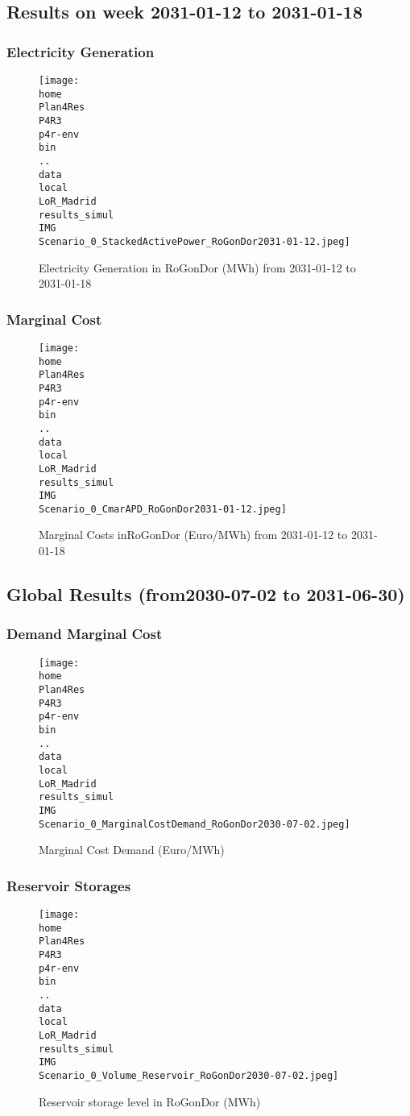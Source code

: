 \documentclass[10pt]{report}
\begin{document}
\subsection{Results on week 2031-01-12 to 2031-01-18}
\subsubsection{Electricity Generation}
\begin{figure}[H]
\centering
\texttt{[image: \\home\\Plan4Res\\P4R3\\p4r-env\\bin\\..\\data\\local\\LoR\_Madrid\\results\_simul\\IMG\\Scenario\_0\_StackedActivePower\_RoGonDor2031-01-12.jpeg]}
\caption{Electricity Generation in RoGonDor (MWh) from 2031-01-12 to 2031-01-18}
\label{fig:Scenario_0_StackedActivePower_RoGonDor2031-01-12.jpeg}
\end{figure}
\subsubsection{Marginal Cost}
\begin{figure}[H]
\centering
\texttt{[image: \\home\\Plan4Res\\P4R3\\p4r-env\\bin\\..\\data\\local\\LoR\_Madrid\\results\_simul\\IMG\\Scenario\_0\_CmarAPD\_RoGonDor2031-01-12.jpeg]}
\caption{Marginal Costs inRoGonDor (Euro/MWh) from 2031-01-12 to 2031-01-18}
\label{fig:Scenario_0_CmarAPD_RoGonDor2031-01-12.jpeg}
\end{figure}
\subsection{Global Results (from2030-07-02 to 2031-06-30)}
\subsubsection{Demand Marginal Cost}
\begin{figure}[H]
\centering
\texttt{[image: \\home\\Plan4Res\\P4R3\\p4r-env\\bin\\..\\data\\local\\LoR\_Madrid\\results\_simul\\IMG\\Scenario\_0\_MarginalCostDemand\_RoGonDor2030-07-02.jpeg]}
\caption{Marginal Cost Demand (Euro/MWh)}
\label{fig:Scenario_0_MarginalCostDemand_RoGonDor2030-07-02.jpeg}
\end{figure}
\subsubsection{Reservoir Storages}
\begin{figure}[H]
\centering
\texttt{[image: \\home\\Plan4Res\\P4R3\\p4r-env\\bin\\..\\data\\local\\LoR\_Madrid\\results\_simul\\IMG\\Scenario\_0\_Volume\_Reservoir\_RoGonDor2030-07-02.jpeg]}
\caption{Reservoir storage level in RoGonDor (MWh)}
\label{fig:Scenario_0_Volume_Reservoir_RoGonDor2030-07-02.jpeg}
\end{figure}
\end{document}
